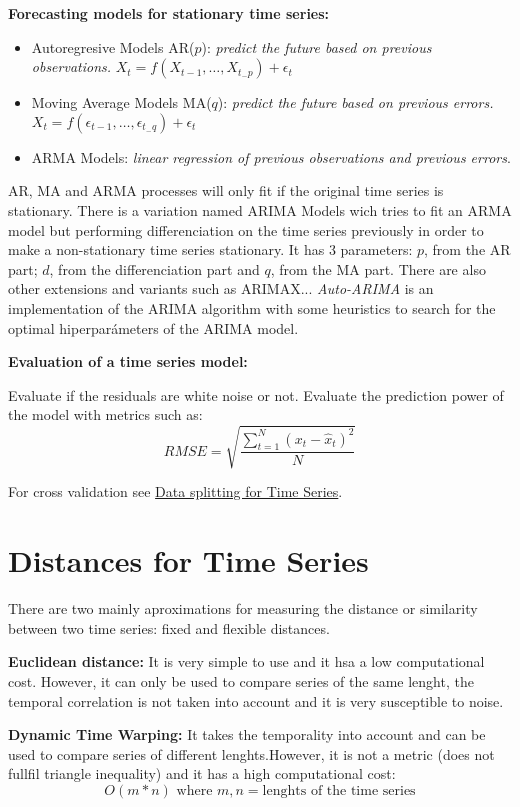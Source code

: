 \textbf{Forecasting models for stationary time series:}
\begin{itemize}
    \item Autoregresive Models AR($p$): \textit{predict the future based on previous observations.} $X_t = f(X_{t-1}, \dots, X_{t_-p}) + \epsilon_t$
    \item Moving Average Models MA($q$): \textit{predict the future based on previous errors.} $X_t = f(\epsilon_{t-1}, \dots, \epsilon_{t_-q}) + \epsilon_t$
    \item ARMA Models: \textit{linear regression of previous observations and previous errors}.
\end{itemize}
AR, MA and ARMA processes will only fit if the original time series is stationary. There is a variation named ARIMA Models wich tries to fit an ARMA model but performing differenciation on the time series previously in order to make a non-stationary time series stationary. It has 3 parameters: $p$, from the AR part; $d$, from the differenciation part and $q$, from the MA part. There are also other extensions and variants such as ARIMAX... \textit{Auto-ARIMA} is an implementation of the ARIMA algorithm with some heuristics to search for the optimal hiperparámeters of the ARIMA model.

\textbf{Evaluation of a time series model:}

Evaluate if the residuals are white noise or not. Evaluate the prediction power of the model with metrics such as:
$$
RMSE = \sqrt{\frac{\sum_{t=1}^{N}(x_t - \hat{x}_t)^2}{N}}
$$

For cross validation see \href{https://topepo.github.io/caret/data-splitting.html}{Data splitting for Time Series}.


\section{Distances for Time Series}
There are two mainly aproximations for measuring the distance or similarity between two time series: fixed and flexible distances.

\textbf{Euclidean distance:} It is very simple to use and it hsa a low computational cost. However, it can only be used to compare series of the same lenght, the temporal correlation is not taken into account and it is very susceptible to noise.

\textbf{Dynamic Time Warping:} It takes the temporality into account and can be used to compare series of different lenghts.However, it is not a metric (does not fullfil triangle inequality) and it has a high computational cost: 
$$
    O(m*n) \text{ where } m,n =\text{lenghts of the time series}
$$ 

